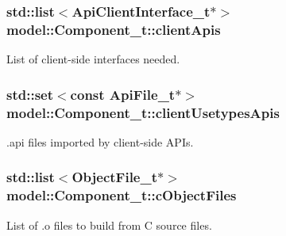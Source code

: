 \subsubsection[{\texorpdfstring{client\+Apis}{clientApis}}]{\setlength{\rightskip}{0pt plus 5cm}std\+::list$<${\bf Api\+Client\+Interface\+\_\+t}$\ast$$>$ model\+::\+Component\+\_\+t\+::client\+Apis}\hypertarget{structmodel_1_1_component__t_adf488c6c1cb7bc280adcde69c9f7152b}{}\label{structmodel_1_1_component__t_adf488c6c1cb7bc280adcde69c9f7152b}


List of client-\/side interfaces needed. 

\subsubsection[{\texorpdfstring{client\+Usetypes\+Apis}{clientUsetypesApis}}]{\setlength{\rightskip}{0pt plus 5cm}std\+::set$<$const {\bf Api\+File\+\_\+t}$\ast$$>$ model\+::\+Component\+\_\+t\+::client\+Usetypes\+Apis}\hypertarget{structmodel_1_1_component__t_a2be02286dc22096e7ae94ef8c9255067}{}\label{structmodel_1_1_component__t_a2be02286dc22096e7ae94ef8c9255067}


.api files imported by client-\/side A\+P\+Is. 

\subsubsection[{\texorpdfstring{c\+Object\+Files}{cObjectFiles}}]{\setlength{\rightskip}{0pt plus 5cm}std\+::list$<${\bf Object\+File\+\_\+t}$\ast$$>$ model\+::\+Component\+\_\+t\+::c\+Object\+Files}\hypertarget{structmodel_1_1_component__t_a10615ee192a04acde21775015e8f7619}{}\label{structmodel_1_1_component__t_a10615ee192a04acde21775015e8f7619}


List of .o files to build from C source files. 

